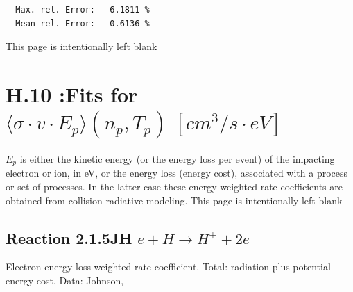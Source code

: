 \documentclass[12pt,dvipdfmx]{article}
\begin{document}
\begin{small}
\begin{verbatim}
  Max. rel. Error:   6.1811 %
  Mean rel. Error:   0.6136 %

\end{verbatim}\end{small}



\newpage
This page is intentionally left blank
\newpage
\section{H.10 :Fits for $\langle\sigma \cdot v \cdot E_p \rangle (n_p,T_p) \
[cm^3/s \cdot eV]$}

$E_p$ is either the kinetic energy (or the energy loss per event) of the impacting electron or ion, in eV, or the
energy loss (energy cost), associated with a process or set of processes.
In the latter case these energy-weighted rate coefficients are obtained from
collision-radiative modeling.
\newpage
This page is intentionally left blank
\newpage

\subsection{
Reaction 2.1.5JH  $ e + H \rightarrow H^+ + 2e $
}

Electron energy loss weighted rate coefficient.
Total: radiation plus potential energy cost. Data: Johnson, \cite{kn:Mahn}
\end{document}
